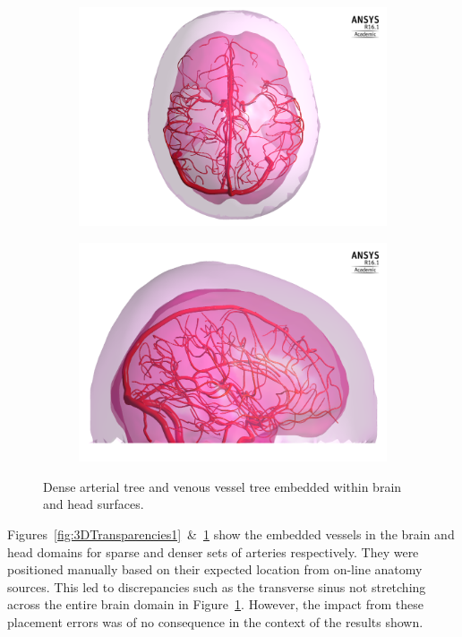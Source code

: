 \documentclass[11pt,english,a4paper,twoside,openright]{report}
\begin{document}
{{{{{{{{\begin{figure}[h]
	\centering	
	\begin{subfigure}[b]{0.45\textwidth}
		\includegraphics[width=\textwidth]{3DFullVessels/ModelTransparency2}
	\end{subfigure}
	\begin{subfigure}[b]{0.45\textwidth}
		\includegraphics[width=\textwidth]{3DFullVessels/ModelTransparency1}
	\end{subfigure}
	\caption[Dense arterial tree and venous vessel tree embedded within brain and head surfaces]{Dense arterial tree and venous vessel tree embedded within brain and head surfaces.}
	\label{fig:3DTransparencies2}
\end{figure}

Figures~\ref{fig:3DTransparencies1}~\&~\ref{fig:3DTransparencies2} show the embedded vessels in the brain and head domains for sparse and denser sets of arteries respectively. They were positioned manually based on their expected location from on-line anatomy sources. This led to discrepancies such as the transverse sinus not stretching across the entire brain domain in Figure~\ref{fig:3DTransparencies2}. However, the impact from these placement errors was of no consequence in the context of the results shown.

}}}}}}}}
\end{document}
